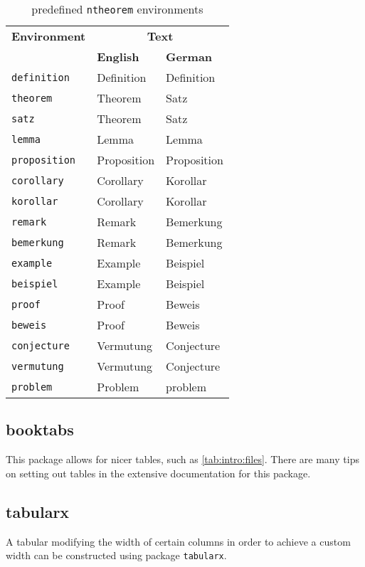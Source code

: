 \begin{table}[hbt]
  \centering
  \begin{tabular}{lll}
    \toprule%
    \textbf{Environment} & \multicolumn{2}{c}{\textbf{Text}} \\
    & \textbf{English} & \textbf{German}\\ \midrule
    \texttt{definition} & Definition & Definition \\
    \texttt{theorem} & Theorem & Satz \\
    \texttt{satz} & Theorem & Satz \\
    \texttt{lemma} & Lemma & Lemma\\
    \texttt{proposition} & Proposition & Proposition \\
    \texttt{corollary} & Corollary & Korollar\\
    \texttt{korollar} & Corollary & Korollar\\
    \texttt{remark} & Remark & Bemerkung \\
    \texttt{bemerkung} & Remark & Bemerkung \\
    \texttt{example} & Example & Beispiel \\
    \texttt{beispiel} & Example & Beispiel \\
    \texttt{proof} & Proof & Beweis \\
    \texttt{beweis} & Proof & Beweis \\
		\texttt{conjecture} & Vermutung & Conjecture \\
		\texttt{vermutung} & Vermutung & Conjecture \\
		\texttt{problem} & Problem & problem \\
\bottomrule

    
  \end{tabular}
  \caption{predefined \texttt{ntheorem} environments}
  \label{tab:ntheorem}
\end{table}



\subsection{booktabs}
\label{sec:intro:booktabs}
This package allows for nicer tables, such as \cref{tab:intro:files}. There are many tips on setting out tables in the extensive documentation for this package.


\subsection{tabularx}
\label{sec:intro:tabularx}
A tabular modifying the width of certain columns in order to achieve a custom width can be constructed using package \texttt{tabularx}.

